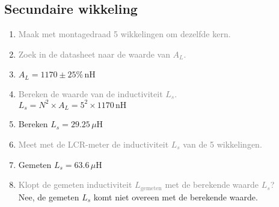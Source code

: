 \subsection{Secundaire wikkeling}
\begin{enumerate}
    \item \textcolor{gray}{Maak met montagedraad 5 wikkelingen om dezelfde kern.}
    \item \textcolor{gray}{Zoek in de datasheet naar de waarde van \( A_L \).}
    \item \( A_L = 1170 \pm 25\% \, \text{nH} \)
    \item \textcolor{gray}{Bereken de waarde van de inductiviteit \( L_s \).}
    \\ \( L_s = N^2 \times A_L = 5^2 \times 1170 \, \text{nH} \)
    \item Bereken \( L_s = 29.25 \, \mu \text{H} \)
    \item \textcolor{gray}{Meet met de LCR-meter de inductiviteit \( L_s \) van de 5 wikkelingen.}
    \item Gemeten \( L_s = 63.6 \, \mu \text{H} \)
    \item \textcolor{gray}{Klopt de gemeten inductiviteit \( L_{\text{gemeten}} \) met de berekende waarde \( L_s \)?}
    \\ Nee, de gemeten \( L_s \) komt niet overeen met de berekende waarde.
\end{enumerate}
